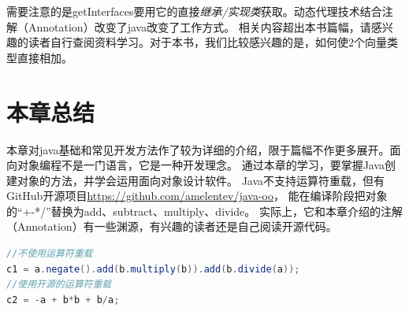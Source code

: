 \noindent
需要注意的是getInterfaces要用它的直接\emph{继承/实现类}获取。动态代理技术结合注解（Annotation）改变了java改变了工作方式。
相关内容超出本书篇幅，请感兴趣的读者自行查阅资料学习。对于本书，我们比较感兴趣的是，如何使2个向量类型直接相加。

\section{本章总结}
本章对java基础和常见开发方法作了较为详细的介绍，限于篇幅不作更多展开。面向对象编程不是一门语言，它是一种开发理念。
通过本章的学习，要掌握Java创建对象的方法，并学会运用面向对象设计软件。
Java不支持运算符重载，但有GitHub开源项目\url{https://github.com/amelentev/java-oo}，
能在编译阶段把对象的“+-*/”替换为add、subtract、multiply、divide。
实际上，它和本章介绍的注解（Annotation）有一些渊源，有兴趣的读者还是自己阅读开源代码。

\begin{lstlisting}[language=Java,mathescape]
//不使用运算符重载
c1 = a.negate().add(b.multiply(b)).add(b.divide(a));
//使用开源的运算符重载
c2 = -a + b*b + b/a;
\end{lstlisting}
